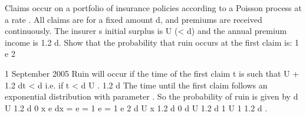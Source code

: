 \documentclass[a4paper,12pt]{article}
\begin{document}
 


Claims occur on a portfolio of insurance policies according to a Poisson process at a
rate . All claims are for a fixed amount d, and premiums are received continuously.
The insurer s initial surplus is U (< d) and the annual premium income is 1.2 d.
Show that the probability that ruin occurs at the first claim is:
1 e
2



1
September 2005
Ruin will occur if the time of the first claim t is such that
U + 1.2 dt < d
i.e. if
t <
d U
.
1.2 d
The time until the first claim follows an exponential distribution with parameter . So
the probability of ruin is given by
d U
1.2 d
0
x
e
dx =
e
= 1 e
= 1 e
2
d U
x 1.2 d
0
d U
1.2 d
1
U
1
1.2
d
.
\end{document}
